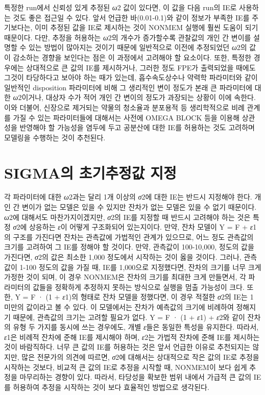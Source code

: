 \documentclass[
  10pt,
]{krantz}
\begin{document}
특정한 run에서 신뢰성 있게 추정된 \emph{ω}2 값이 있다면, 이 값을 다음 run의 IE로 사용하는 것도 좋은
접근일 수 있다. 앞서 언급한 바(0.01-0.1)와 같이 정보가 부족한 IE를 주기보다는, 이미 추정된 값을 IE로 제시하는
것이 NONMEM 실행에 훨씬 도움이 되기 때문이다. 다만, 추정을 허용하는 \emph{ω}2의 개수가
증가할수록 관찰값의 개인 간 변이를 설명할 수 있는 방법이 많아지는 것이기 때문에 일반적으로 이전에 추정되었던
\emph{ω}2의 값이 감소하는 경향을 보인다는 점은 이 과정에서 고려해야 할 요소이다. 또한, 특정한 경우에는
상대적으로 큰 값의 IE를 제시하거나, 그러한 정도 FPE가 출력되었을 때에도 그것이 타당하다고 보아야 하는 때가
있는데, 흡수속도상수나 약력학 파라미터와 같이 일반적인 disposition 파라미터에 비해 그 생리적인 변이 정도가
본래 큰 파라미터에 대한 \emph{ω}2이거나, 대상자 수가 적어 개인 간 변이의 정도가 과장되는 상황이 이에
속한다. 이와 더불어, 신장으로 제거되는 약물의 청소율과 분포용적 등 생리학적으로 비례 관계를 가질 수 있는 파라미터들에
대해서는 사전에 OMEGA BLOCK 등을 이용해 상관성을 반영해야 할 가능성을 염두에 두고 공분산에 대한 IE를 허용하는
것도 고려하며 모델링을 수행하는 것이 추천된다.

\hypertarget{sigmauxc758-uxcd08uxae30uxcd94uxc815uxac12-uxc9c0uxc815}{%
\section{SIGMA의 초기추정값 지정}\label{sigmauxc758-uxcd08uxae30uxcd94uxc815uxac12-uxc9c0uxc815}}

각 파라미터에 대한 \emph{ω}2과는 달리 1개 이상의 \emph{σ}2에 대한 IE는 반드시 지정해야
한다. 개인 간 변이가 없는 모델은 있을 수 있지만 잔차가 없는 모델은 있을 수 없기 때문이다. \emph{ω}2에
대해서도 마찬가지이겠지만, \emph{σ}2의 IE를 지정할 때 반드시 고려해야 하는 것은 특정
\emph{σ}2에 상응하는 \emph{ε}이 어떻게 구조화되어 있는지이다. 만약, 잔차 모델이 Y = F +
\emph{ε}1의 구조를 가진다면 잔차는 관측값에 가법적인 관계가 있으므로, 어느 정도 관측값의 크기를 고려하여 그
IE를 정해야 할 것이다. 만약, 관측값이 100-10,000, 정도의 값을 가진다면, \emph{σ}2의 값은 최소한
1,000 정도에서 시작하는 것이 옳을 것이다. 그러나, 관측값이 1-100 정도의 값을 가질 때, IE를 1,000으로
지정했다면, 잔차의 크기를 너무 크게 가정한 것이 되며, 이 경우 NONMEM은 잔차의 크기를 최대한 크게
만들면서, 각 파라미터의 값들을 정확하게 추정하지 못하는 방식으로 실행을 멈출 가능성이 크다. 또한, Y = F ·
(1 + \emph{ε}1)의 형태로 잔차 모델을 정했다면, 이 경우 적절한 \emph{σ}2의 IE는 1
미만의 값이라고 볼 수 있다. 이 모델에서는 잔차가 예측값의 크기에 비례하여 정해지기 때문에, 관측값의 크기는 고려할 필요가
없다. Y = F · (1 + \emph{ε}1) + \emph{ε}2와 같이 잔차의 유형 두 가지를
동시에 쓰는 경우에도, 개별 \emph{ε}들은 동일한 특성을 유지한다. 따라서, \emph{ε}1은 비례적 잔차에 준해
IE를 제시해야 하며, \emph{ε}2는 가법적 잔차에 준해 IE를 제시하는 것이 바람직하다. 너무 큰 값의 IE를
허용하는 것은 앞서 언급한 이유로 추천되지는 않지만, 많은 전문가의 의견에 따르면, \emph{σ}2에 대해서는
상대적으로 작은 값의 IE로 추정을 시작하는 것보다, 비교적 큰 값의 IE로 추정을 시작할 때, NONMEM이 보다 쉽게
추정을 마무리하는 경향이 있다. 따라서, 타당성을 확보한 범위 내에서 가급적 큰 값의 IE를 허용하여 추정을 시작하는 것이
보다 효율적인 방법으로 생각된다.
\end{document}
